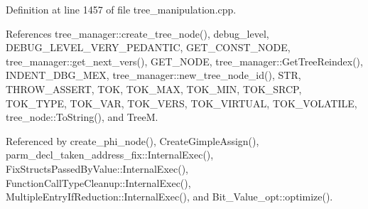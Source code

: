 Definition at line 1457 of file tree\+\_\+manipulation.\+cpp.



References tree\+\_\+manager\+::create\+\_\+tree\+\_\+node(), debug\+\_\+level, D\+E\+B\+U\+G\+\_\+\+L\+E\+V\+E\+L\+\_\+\+V\+E\+R\+Y\+\_\+\+P\+E\+D\+A\+N\+T\+IC, G\+E\+T\+\_\+\+C\+O\+N\+S\+T\+\_\+\+N\+O\+DE, tree\+\_\+manager\+::get\+\_\+next\+\_\+vers(), G\+E\+T\+\_\+\+N\+O\+DE, tree\+\_\+manager\+::\+Get\+Tree\+Reindex(), I\+N\+D\+E\+N\+T\+\_\+\+D\+B\+G\+\_\+\+M\+EX, tree\+\_\+manager\+::new\+\_\+tree\+\_\+node\+\_\+id(), S\+TR, T\+H\+R\+O\+W\+\_\+\+A\+S\+S\+E\+RT, T\+OK, T\+O\+K\+\_\+\+M\+AX, T\+O\+K\+\_\+\+M\+IN, T\+O\+K\+\_\+\+S\+R\+CP, T\+O\+K\+\_\+\+T\+Y\+PE, T\+O\+K\+\_\+\+V\+AR, T\+O\+K\+\_\+\+V\+E\+RS, T\+O\+K\+\_\+\+V\+I\+R\+T\+U\+AL, T\+O\+K\+\_\+\+V\+O\+L\+A\+T\+I\+LE, tree\+\_\+node\+::\+To\+String(), and TreeM.



Referenced by create\+\_\+phi\+\_\+node(), Create\+Gimple\+Assign(), parm\+\_\+decl\+\_\+taken\+\_\+address\+\_\+fix\+::\+Internal\+Exec(), Fix\+Structs\+Passed\+By\+Value\+::\+Internal\+Exec(), Function\+Call\+Type\+Cleanup\+::\+Internal\+Exec(), Multiple\+Entry\+If\+Reduction\+::\+Internal\+Exec(), and Bit\+\_\+\+Value\+\_\+opt\+::optimize().

